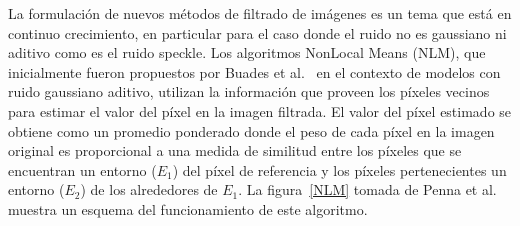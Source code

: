 \documentclass[12pt]{article}
\begin{document}







La formulación de nuevos métodos de filtrado de imágenes es un tema que está en continuo crecimiento, en particular para el caso donde el ruido no es gaussiano ni aditivo como es el ruido speckle. 
Los algoritmos NonLocal Means (NLM), que inicialmente fueron propuestos por Buades et al.~\cite{Buades2005} en el contexto de modelos con ruido gaussiano aditivo, utilizan la información que proveen los píxeles vecinos para estimar el valor del píxel en la imagen filtrada. 
El valor del píxel estimado se obtiene como un promedio ponderado donde el peso de cada píxel en la imagen original es proporcional a una medida de similitud entre los píxeles que se encuentran
un entorno ($E_1$) del píxel de referencia y los píxeles pertenecientes un entorno ($E_2$) de los alrededores de $E_1$. La figura~\ref{NLM} tomada de Penna et al.~\cite{Penna2013} muestra un esquema del funcionamiento de este algoritmo. 
\end{document}
